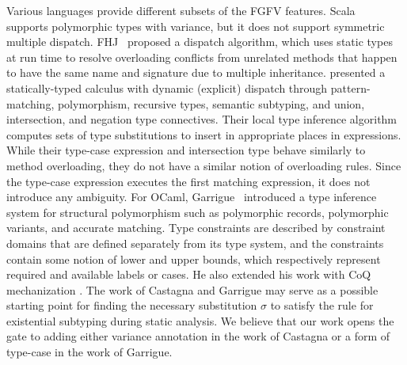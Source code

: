 Various languages provide different subsets of the FGFV features.
Scala~\cite{scala} supports polymorphic types
with variance, but it does not support symmetric multiple dispatch.
FHJ~\cite{fhj} proposed a dispatch algorithm, which uses static types at run time 
to resolve overloading conflicts from unrelated methods that happen to have
the same name and signature due to multiple inheritance.
\citet{castagna15} presented a statically-typed calculus with dynamic
(explicit) dispatch through pattern-matching, polymorphism, recursive
types, semantic subtyping, and union, intersection, and negation type
connectives.  Their local type inference algorithm computes sets of type
substitutions to insert in appropriate places in expressions.  While
their type-case expression and intersection type behave similarly to
method overloading, they do not have a similar notion of overloading
rules.  Since the type-case expression executes the first matching
expression, it does not introduce any ambiguity.
For OCaml, Garrigue~\citeyearpar{garrigue01,garrigue02} introduced a type
inference system for structural polymorphism such as polymorphic records,
polymorphic variants, and accurate matching.  Type constraints are
described by constraint domains that are defined separately from its
type system, and the constraints contain some notion of lower and upper
bounds, which respectively represent required and available labels or cases.
He also extended his work with CoQ mechanization \cite{garrigue10,garrigue15}.
The work of Castagna and Garrigue may serve as a possible starting point
for finding the necessary substitution $\sigma$ to satisfy the rule
 for existential subtyping during static analysis.
We believe that our work opens the gate to adding either variance
annotation in the work of Castagna or a form of type-case in the work of
Garrigue.
